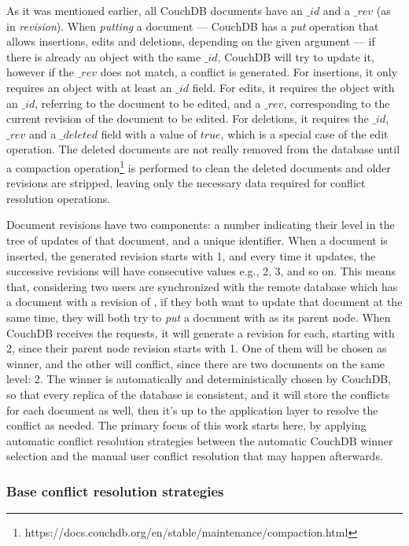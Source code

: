 As it was mentioned earlier, all CouchDB documents have an $\_id$ and a $\_rev$ (as in \textit{revision}). When \textit{putting} a document --- CouchDB has a \textit{put} operation that allows insertions, edits and deletions, depending on the given argument --- if there is already an object with the same $\_id$, CouchDB will try to update it, however if the $\_rev$ does not match, a conflict is generated. For insertions, it only requires an object with at least an $\_id$ field. For edits, it requires the object with an $\_id$, referring to the document to be edited, and a $\_rev$, corresponding to the current revision of the document to be edited. For deletions, it requires the $\_id$, $\_rev$ and a $\_deleted$ field with a value of $true$, which is a special case of the edit operation. The deleted documents are not really removed from the database until a compaction operation\footnote{https://docs.couchdb.org/en/stable/maintenance/compaction.html} is performed to clean the deleted documents and older revisions are stripped, leaving only the necessary data required for conflict resolution operations.

Document revisions have two components: a number indicating their level in the tree of updates of that document, and a unique identifier. When a document is inserted, the generated revision starts with 1, and every time it updates, the successive revisions will have consecutive values e.g., 2, 3, and so on. This means that, considering two users are synchronized with the remote database which has a document with a revision of , if they both want to update that document at the same time, they will both try to \textit{put} a document with  as its parent node. When CouchDB receives the requests, it will generate a revision for each, starting with 2, since their parent node revision starts with 1. One of them will be chosen as winner, and the other will conflict, since there are two documents on the same level: 2. The winner is automatically and deterministically chosen by CouchDB, so that every replica of the database is consistent, and it will store the conflicts for each document as well, then it's up to the application layer to resolve the conflict as needed. The primary focus of this work starts here, by applying automatic conflict resolution strategies between the automatic CouchDB winner selection and the manual user conflict resolution that may happen afterwards.

\subsubsection{Base conflict resolution strategies}

